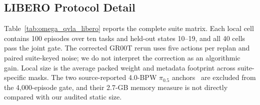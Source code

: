 

\subsection{LIBERO Protocol Detail}
\label{sec:libero_comparison}



Table~\ref{tab:omega_qvla_libero} reports the complete suite matrix. Each local cell contains 100 episodes over ten tasks and held-out states 10--19, and all 40 cells pass the joint gate. The corrected GR00T rerun uses five actions per replan and paired suite-keyed noise; we do not interpret the correction as an algorithmic gain. Local size is the average packed weight and metadata footprint across suite-specific masks. The two source-reported 4.0-BPW $\pi_{0.5}$ anchors~\cite{akbari2026actquant,xu2026qvla} are excluded from the 4,000-episode gate, and their 2.7-GB memory measure is not directly compared with our audited static size.
